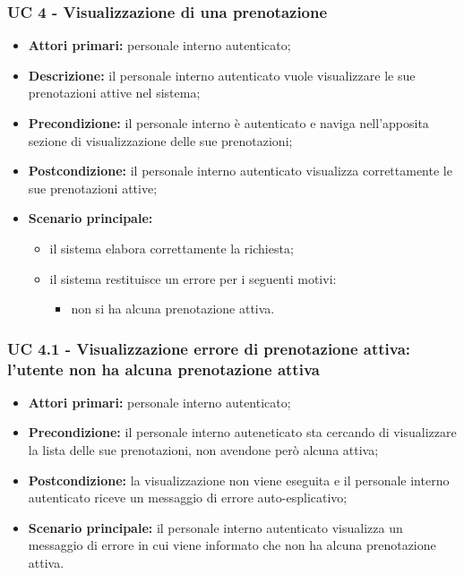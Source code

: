 \subsubsection{UC 4 - Visualizzazione di una prenotazione}

\begin{itemize}
\item \textbf{Attori primari:} personale interno autenticato;
\item \textbf{Descrizione:} il personale interno autenticato vuole visualizzare le sue prenotazioni attive nel sistema;
\item \textbf{Precondizione:} il personale interno è autenticato e naviga nell’apposita sezione di visualizzazione delle sue prenotazioni;
\item \textbf{Postcondizione:} il personale interno autenticato visualizza correttamente le sue prenotazioni attive;
\item \textbf{Scenario principale:} 
	\begin{itemize}
		\item il sistema elabora correttamente la richiesta;
		\item il sistema restituisce un errore per i seguenti motivi:
		\begin{itemize}
			\item non si ha alcuna prenotazione attiva.
		\end{itemize}
	\end{itemize}
\end{itemize}

\subsubsection{UC 4.1 - Visualizzazione errore di prenotazione attiva: l'utente non ha alcuna prenotazione attiva}
\begin{itemize}
\item \textbf{Attori primari:} personale interno autenticato;
\item \textbf{Precondizione:} il personale interno auteneticato sta cercando di visualizzare la lista delle sue prenotazioni, non avendone però alcuna attiva;
\item \textbf{Postcondizione:} la visualizzazione non viene eseguita e il personale interno autenticato riceve un messaggio di errore auto-esplicativo;
\item \textbf{Scenario principale:} il personale interno autenticato visualizza un messaggio di errore in cui viene informato che non ha alcuna prenotazione attiva.
\end{itemize}